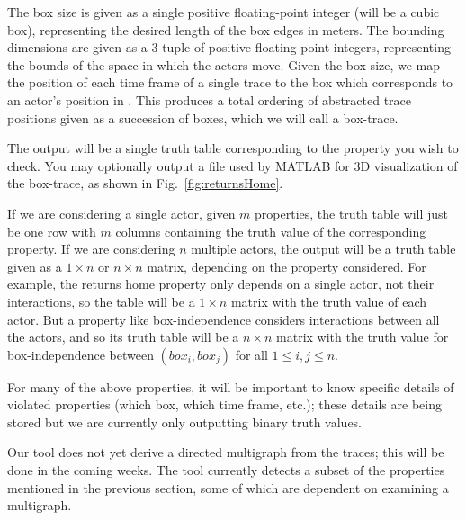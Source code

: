 The box size is given as a single positive floating-point integer (will be a cubic box), representing the desired length of the box edges in meters.
The bounding dimensions are given as a 3-tuple of positive floating-point integers, representing the bounds of the space in which the actors move.
Given the box size, we map the position of each time frame of a single trace to the box which corresponds to an actor's position in \rthree.
 This produces a total ordering of abstracted trace positions given as a succession of boxes, which we will call a box-trace.
 
 
 
 The output will be a single truth table corresponding to the property you wish to check.
 You may optionally output a file used by MATLAB for 3D visualization of the box-trace, as shown in Fig.~\ref{fig:returnsHome}.
 
 If we are considering a single actor, given $m$ properties, the truth table will just be one row with $m$ columns containing the truth value of the corresponding property.
 If we are considering $n$ multiple actors, the output will be a truth table given as a $1 \times n$ or $n \times n$ matrix, depending on the property considered.
 For example, the returns home property only depends on a single actor, not their interactions, so the table will be a $1 \times n$ matrix with the truth value of each actor.
 But a property like box-independence considers interactions between all the actors, and so its truth table will be a $n \times n$ matrix with the truth value for box-independence between $(box_i,box_j)$ for all $1 \leq i,j \leq n$.
 
  For many of the above properties, it will be important to know specific details of violated properties (which box, which time frame, etc.); these details are being stored but we are currently only outputting binary truth values.
  
  Our tool does not yet derive a directed multigraph from the traces; this will be done in the coming weeks.
  The tool currently detects a subset of the properties mentioned in the previous section, some of which are dependent on examining a multigraph.  
